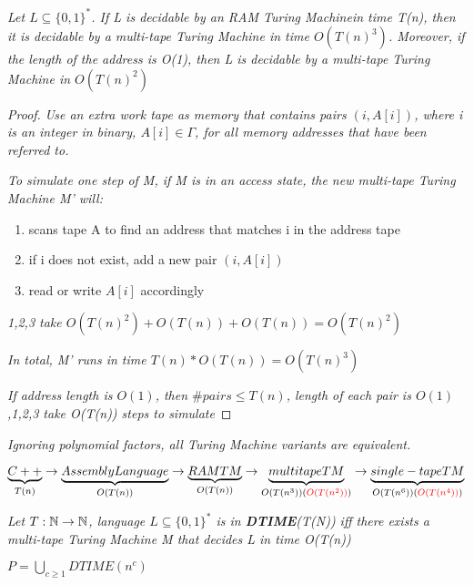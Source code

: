 \documentclass{article}
\begin{document}
\newpage
\begin{lemma}
    \textit{Let $L\subseteq\{0,1\}^*$. If L is decidable by an RAM Turing Machinein time T(n), then it is decidable by a multi-tape Turing Machine in time $O(T(n)^3)$. Moreover, if the length of the address is O(1), then L is decidable by a multi-tape Turing Machine in $O(T(n)^2)$}

    \begin{proof}
        \textit{Use an extra work tape as memory that contains pairs $(i,A[i])$, where i is an integer in binary, $A[i]\in\varGamma$, for all memory addresses that have been referred to.}

        \textit{To simulate one step of M, if M is in an access state, the new multi-tape Turing Machine M' will:}

        \begin{enumerate}
            \item scans tape A to find an address that matches i in the address tape
            \item if i does not exist, add a new pair $(i,A[i])$
            \item read or write $A[i]$ accordingly
        \end{enumerate}

        \textit{1,2,3 take $O(T(n)^2)+O(T(n))+O(T(n)) = O(T(n)^2)$}

        \textit{In total, M' runs in time $T(n)*O(T(n)) = O(T(n)^3)$}

        \textit{If address length is $O(1)$, then $\#pairs\leq T(n)$, length of each pair is $O(1)$,1,2,3 take O(T(n)) steps to simulate}
    \end{proof}

    \begin{remark}
        \textit{Ignoring polynomial factors, all Turing Machine variants are equivalent.}
    \end{remark}

    \textit{$\underbrace{C++}_{T(n)} \rightarrow \underbrace{Assembly Language}_{O(T(n))}\rightarrow \underbrace{RAM TM}_{O(T(n))} \rightarrow \underbrace{multitape TM}_{O(T(n^3))(\textcolor{red}{O(T(n^2))})} \rightarrow \underbrace{single-tape TM}_{O(T(n^6))(\textcolor{red}{O(T(n^4))})}$}

\end{lemma}

\begin{defn}
    \textit{Let $T: \mathbb{N}\rightarrow\mathbb{N}$, language $L\subseteq \{0,1\}^*$ is in \textbf{DTIME}(T(N)) iff there exists a multi-tape Turing Machine M that decides L in time O(T(n))}
\end{defn}

\begin{defn}
    $P = \bigcup_{c\geq1}DTIME(n^c)$
\end{defn}
\ifx\allfiles\undefined
\end{document}
